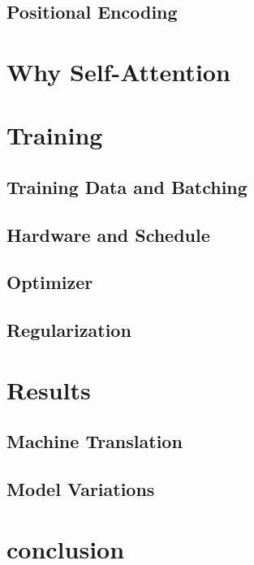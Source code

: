 \documentclass[twocolumn]{jarticle}     %
\begin{document}
\subsection{Positional Encoding}

\section{Why Self-Attention}

\section{Training}

\subsection{Training Data and Batching}

\subsection{Hardware and Schedule}

\subsection{Optimizer}

\subsection{Regularization}

\section{Results}

\subsection{Machine Translation}

\subsection{Model Variations}

\section{conclusion}




\end{document}
